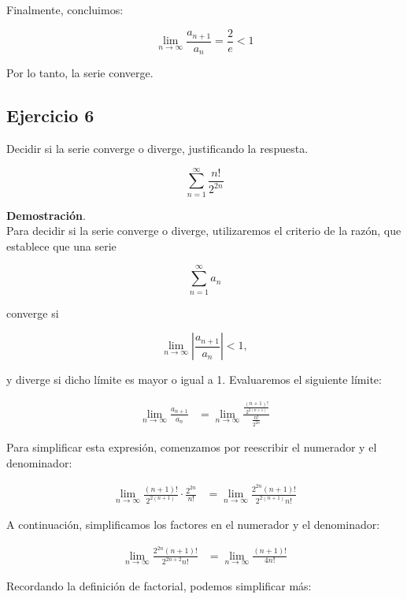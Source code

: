 \documentclass{article}
\begin{document}
    Finalmente, concluimos:

    $$
    \lim _{n \rightarrow \infty} \frac{a_{n+1}}{a_{n}} = \frac{2}{e} < 1
    $$

    Por lo tanto, la serie converge.

    \subsection*{Ejercicio 6}

    Decidir si la serie converge o diverge, justificando la respuesta.

    $$
    \sum_{n=1}^{\infty} \frac{n!}{2^{2 n}}
    $$

    \textbf{Demostración}.\\

    Para decidir si la serie converge o diverge, utilizaremos el criterio de la razón, que establece que una serie

    $$
    \sum_{n=1}^{\infty} a_n
    $$

    converge si

    $$
    \lim_{n \rightarrow \infty} \left| \frac{a_{n+1}}{a_{n}} \right| < 1,
    $$

    y diverge si dicho límite es mayor o igual a 1. Evaluaremos el siguiente límite:

    \begin{align*}
    \lim _{n \rightarrow \infty} \frac{a_{n+1}}{a_{n}} &= \lim _{n \rightarrow \infty} \frac{\frac{(n+1)!}{2^{2(n+1)}}}{\frac{n!}{2^{2 n}}}
    \end{align*}

    Para simplificar esta expresión, comenzamos por reescribir el numerador y el denominador:

    \begin{align*}
    \lim _{n \rightarrow \infty} \frac{(n+1)!}{2^{2(n+1)}} \cdot \frac{2^{2n}}{n!} &= \lim _{n \rightarrow \infty} \frac{2^{2 n}(n+1)!}{2^{2(n+1)} n!}
    \end{align*}

    A continuación, simplificamos los factores en el numerador y el denominador:

    \begin{align*}
    \lim _{n \rightarrow \infty} \frac{2^{2 n}(n+1)!}{2^{2 n + 2} n!} &= \lim _{n \rightarrow \infty} \frac{(n+1)!}{4 n!}
    \end{align*}

    Recordando la definición de factorial, podemos simplificar más:
\end{document}
